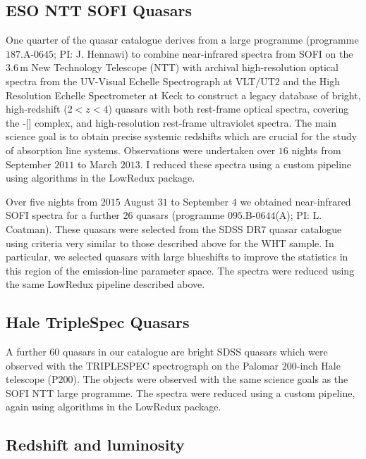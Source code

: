 \subsection{ESO NTT SOFI Quasars}

One quarter of the quasar catalogue derives from a large programme (programme $187$.A-$0645$; PI: J. Hennawi) to combine near-infrared spectra from SOFI \citep{moorwood98a} on the $3.6$\,m New Technology Telescope (NTT) with archival high-resolution optical spectra from the UV-Visual Echelle Spectrograph \citep[UVES;][]{dekker00} at VLT/UT$2$ and the High Resolution Echelle Spectrometer \citep[HIRES;][]{vogt94} at Keck to construct a legacy database of bright, high-redshift ($2 < z < 4$) quasars with both rest-frame optical spectra, covering the \hbns-[] complex, and high-resolution rest-frame ultraviolet spectra.
The main science goal is to obtain precise systemic redshifts which are crucial for the study of absorption line systems.  
Observations were undertaken over $16$ nights from September $2011$ to March $2013$.
I reduced these spectra using a custom pipeline using algorithms in the LowRedux package.

Over five nights from $2015$ August $31$ to September $4$ we obtained near-infrared SOFI spectra for a further $26$ quasars (programme $095$.B-$0644$(A); PI: L. Coatman). 
These quasars were selected from the SDSS DR$7$ quasar catalogue using criteria very similar to those described above for the WHT sample. 
In particular, we selected quasars with large  blueshifts to improve the statistics in this region of the  emission-line parameter space. 
The spectra were reduced using the same LowRedux pipeline described above. 

\subsection{Hale TripleSpec Quasars}

A further $60$ quasars in our catalogue are bright SDSS quasars which were observed with the TRIPLESPEC spectrograph \citep{herter08} on the Palomar $200$-inch Hale telescope (P$200$). 
The objects were observed with the same science goals as the SOFI NTT large programme. 
The spectra were reduced using a custom pipeline, again using algorithms in the LowRedux package. 

\subsection{Redshift and luminosity}

